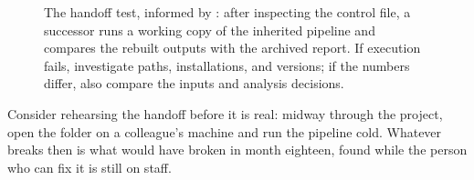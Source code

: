 \begin{figure}[htbp]
\centering
{}
\caption[The handoff test: run before you read]{The handoff test, informed by \textcite{pilgrim2023code}: after inspecting the control file, a successor runs a working copy of the inherited pipeline and compares the rebuilt outputs with the archived report. If execution fails, investigate paths, installations, and versions; if the numbers differ, also compare the inputs and analysis decisions.}
\label{fig:ch02-viz-handoff}
\end{figure}

Consider rehearsing the handoff before it is real: midway through the project, open the folder on a colleague's machine and run the pipeline cold. Whatever breaks then is what would have broken in month eighteen, found while the person who can fix it is still on staff.

